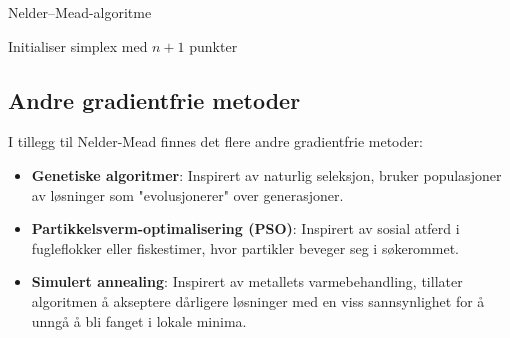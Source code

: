 \begin{algorithm}[H]
	\caption{Nelder--Mead-algoritme}
	\label{alg:nelder-mead}
	Initialiser simplex med \( n+1 \) punkter\;
\end{algorithm}


\subsection{Andre gradientfrie metoder}

I tillegg til Nelder-Mead finnes det flere andre gradientfrie metoder:

\begin{itemize}
	\item \textbf{Genetiske algoritmer}: Inspirert av naturlig seleksjon, bruker populasjoner av løsninger som "evolusjonerer" over generasjoner.
	\item \textbf{Partikkelsverm-optimalisering (PSO)}: Inspirert av sosial atferd i fugleflokker eller fiskestimer, hvor partikler beveger seg i søkerommet.
	\item \textbf{Simulert annealing}: Inspirert av metallets varmebehandling, tillater algoritmen å akseptere dårligere løsninger med en viss sannsynlighet for å unngå å bli fanget i lokale minima.
\end{itemize}
